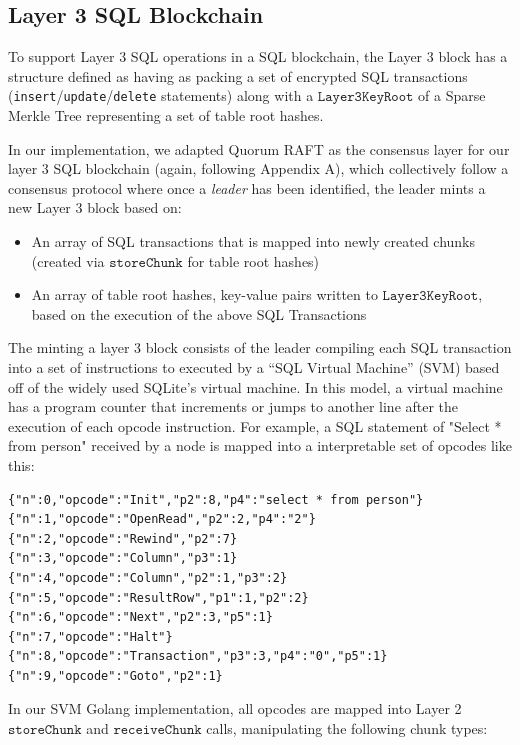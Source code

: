 \documentclass{article}
\begin{document}
\subsection{Layer 3 SQL Blockchain}

To support Layer 3 SQL operations in a SQL blockchain, the Layer 3 block has a  structure defined as having as packing a set of encrypted SQL transactions ({\tt insert}/{\tt update}/{\tt delete} statements)  along with a $\texttt{Layer3KeyRoot}$ of a Sparse Merkle Tree representing a set of table root hashes.

In our implementation, we adapted Quorum RAFT as the consensus layer for our layer 3 SQL blockchain (again, following Appendix A), which collectively follow a consensus protocol where once a {\em leader} has been identified, the leader mints a new Layer 3 block based on:
\begin{itemize}
\item An array of SQL transactions that is mapped into newly created chunks (created via $\texttt{storeChunk}$ for table root hashes)
\item An array of table root hashes, key-value pairs written to $\texttt{Layer3KeyRoot}$, based on the execution of the above SQL Transactions
\end{itemize}
The minting a layer 3 block consists of the leader compiling each SQL transaction into a set of instructions to executed by a ``SQL Virtual Machine'' (SVM) based off of the widely used SQLite's virtual machine.  In this model, a virtual machine has a program counter that increments or jumps to another line after the execution of each opcode instruction.  For example, a SQL statement of "Select * from person" received by a node is mapped into a interpretable set of opcodes like this:
\begin{verbatim}
{"n":0,"opcode":"Init","p2":8,"p4":"select * from person"}
{"n":1,"opcode":"OpenRead","p2":2,"p4":"2"}
{"n":2,"opcode":"Rewind","p2":7}
{"n":3,"opcode":"Column","p3":1}
{"n":4,"opcode":"Column","p2":1,"p3":2}
{"n":5,"opcode":"ResultRow","p1":1,"p2":2}
{"n":6,"opcode":"Next","p2":3,"p5":1}
{"n":7,"opcode":"Halt"}
{"n":8,"opcode":"Transaction","p3":3,"p4":"0","p5":1}
{"n":9,"opcode":"Goto","p2":1}
\end{verbatim}
In our SVM Golang implementation, all opcodes are mapped into Layer 2 $\texttt{storeChunk}$ and  $\texttt{receiveChunk}$ calls, manipulating the following chunk types:
\end{document}
